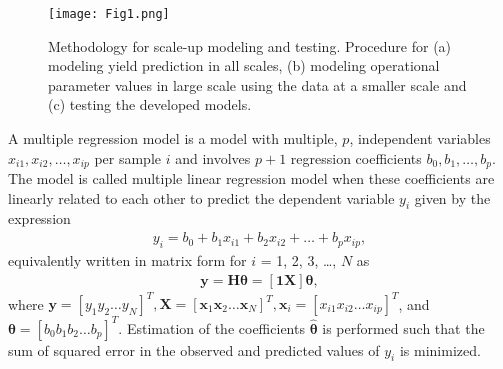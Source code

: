 \documentclass{article}
\begin{document}
\begin{figure}[ht]

\begin{minipage}[b]{1.0\linewidth}
  \centering
  \centerline{\texttt{[image: Fig1.png]}}
  \vspace{-3mm}
\end{minipage}
%
\caption{Methodology for scale-up modeling and testing. Procedure for (a) modeling yield prediction in all scales, (b) modeling operational parameter values in large scale using the data at a smaller scale and (c) testing the developed models.}
\label{fig:blockdiagram}
\vspace{-3mm}
\end{figure}


A multiple regression model \cite{ScaleUp_MLSP:stockburger01} is a model with multiple, $p$, independent variables $x_{i1}, x_{i2}, \ldots, x_{ip}$ per sample $i$ and involves $p + 1$ regression coefficients %
$b_0, b_1, \ldots, b_p$. The model is called multiple linear regression model when these coefficients are linearly related to each other to predict the dependent variable $y_i$ given by the expression
\begin{align}\label{eq:mlregress}
	y_i = b_0 + b_1 x_{i1} + b_2 x_{i2}+ \ldots + b_p x_{ip},
\end{align}                                                          
equivalently written in matrix form for $i$ = 1, 2, 3, \ldots, $N$ as 
\begin{align}\label{eq:mlregress2}
	\mathbf{y} = \mathbf{H}\boldsymbol{\theta} = [\mathbf{1} \mathbf{X}]\boldsymbol{\theta},
\end{align}
where $\mathbf{y} = [y_1 y_2 \ldots y_N]^T, \mathbf{X} = [\mathbf{x}_1 \mathbf{x}_2 \ldots \mathbf{x}_N]^T, \mathbf{x}_i = [x_{i1} x_{i2} \ldots x_{ip}]^T$, and $\boldsymbol{\theta} = [b_0 b_1 b_2 \ldots b_p]^T$. Estimation of the coefficients $\hat{\boldsymbol{\theta}}$ is performed such that the sum of squared error in the observed and predicted values of $y_i$ is minimized.
\end{document}
